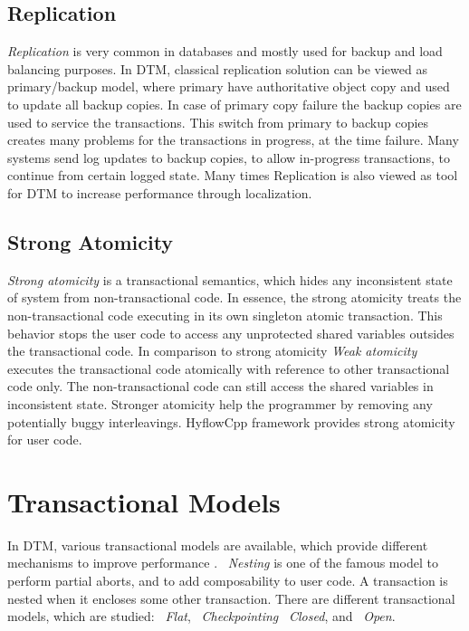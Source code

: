 \documentclass[12pt,english]{report}
\begin{document}
\subsection{Replication}

\textit{Replication} is very common in databases and mostly used for backup and load balancing purposes. In DTM, classical replication solution can be viewed as primary/backup model, where primary have authoritative object copy and used to update all backup copies. In case of primary copy failure the backup copies are used to service the transactions. This switch from primary to backup copies creates many problems for the transactions in progress, at the time failure. Many systems send log updates to backup copies, to allow in-progress transactions, to continue from certain logged state. Many times Replication is also viewed as tool for DTM to increase performance through localization.

\subsection{Strong Atomicity}

\textit{Strong atomicity} is a transactional semantics, which hides any inconsistent state of system from non-transactional code. In essence, the strong atomicity treats the non-transactional code executing in its own singleton atomic transaction. This behavior stops the user code to access any unprotected shared variables outsides the transactional code. In comparison to strong atomicity \textit{ Weak atomicity} executes the transactional code atomically with reference to other transactional code only. The non-transactional code can still access the shared variables in inconsistent state. Stronger atomicity help the programmer by removing any potentially buggy interleavings. HyflowCpp framework provides strong atomicity for user code.     

\section{Transactional Models}

In DTM, various transactional models are available, which provide different mechanisms to improve performance . ~\emph{Nesting} is one of the famous model to perform partial aborts, and to add composability to user code. A transaction is nested when it encloses some other transaction. There are different transactional  models, which are studied: ~\emph{Flat}, ~\emph{Checkpointing} ~\emph{Closed}, and ~\emph{Open}. 
\end{document}
